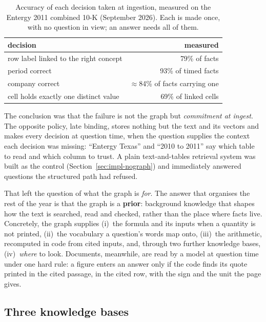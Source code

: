 \begin{table}[h]
\centering\small
\caption{Accuracy of each decision taken at ingestion, measured on the Entergy 2011 combined 10-K (September 2026). Each is made once, with no question in view; an answer needs all of them.}
\label{tab:commitment}
\begin{tabular}{lr}
\toprule
decision & measured \\
\midrule
row label linked to the right concept & 79\% of facts \\
period correct & 93\% of timed facts \\
company correct & \(\approx\)84\% of facts carrying one \\
cell holds exactly one distinct value & 69\% of linked cells \\
\bottomrule
\end{tabular}
\end{table}

The conclusion was that the failure is not the graph but \emph{commitment at ingest}. The opposite policy, late binding, stores nothing but the text and its vectors and makes every decision at question time, when the question supplies the context each decision was missing: ``Entergy Texas'' and ``2010 to 2011'' say which table to read and which column to trust. A plain text-and-tables retrieval system was built as the control (Section~\ref{sec:impl-nograph}) and immediately answered questions the structured path had refused.

That left the question of what the graph is \emph{for}. The answer that organises the rest of the year is that the graph is a \textbf{prior}: background knowledge that shapes how the text is searched, read and checked, rather than the place where facts live. Concretely, the graph supplies (i)~the formula and its inputs when a quantity is not printed, (ii)~the vocabulary a question's words map onto, (iii)~the arithmetic, recomputed in code from cited inputs, and, through two further knowledge bases, (iv)~\emph{where} to look. Documents, meanwhile, are read by a model at question time under one hard rule: a figure enters an answer only if the code finds its quote printed in the cited passage, in the cited row, with the sign and the unit the page gives.

\subsection{Three knowledge bases}
\label{sec:idea-three}

